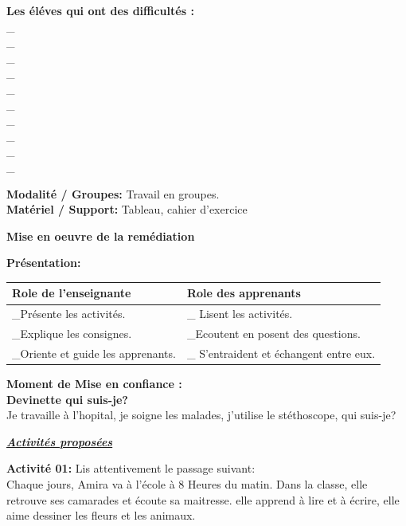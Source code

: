 \documentclass[a4paper,11pt]{article}
\begin{document}
\vspace{3pt}
\noindent\textbf{Les éléves qui ont des difficultés :}\\
\_{}\\[-3pt]
\_{}\\[-3pt]
\_{}\\[-3pt]
\_{}\\[-3pt]
\_{}\\[-3pt]
\_{}\\[-3pt]
\_{}\\[-3pt]
\_{}\\[-3pt]
\_{}\\[-3pt]
\_{}

\vspace{3pt}
\noindent\textbf{Modalité / Groupes:} Travail en groupes.\\
\textbf{Matériel / Support:} Tableau, cahier d'exercice

\vspace{4pt}
\begin{tcolorbox}[colback=white,colframe=black,arc=0mm,boxrule=0.8pt,halign=center,top=3pt,bottom=3pt]
\textbf{Mise en oeuvre de la remédiation}
\end{tcolorbox}

\vspace{-2pt}
\noindent\textbf{Présentation:}

\vspace{2pt}
\noindent
\begin{tabularx}{\textwidth}{|X|X|}
\hline
\textbf{Role de l'enseignante} & \textbf{Role des apprenants} \\
\hline
\_Présente les activités. & \_ Lisent les activités. \\
\_Explique les consignes. & \_Ecoutent en posent des questions. \\
\_Oriente et guide les apprenants. & \_ S'entraident et échangent entre eux. \\
\hline
\end{tabularx}

\vspace{4pt}
\noindent\textbf{Moment de Mise en confiance :}\\
\textbf{Devinette qui suis-je?}\\
Je travaille à l'hopital, je soigne les malades, j'utilise le stéthoscope, qui suis-je?

\vspace{4pt}
\noindent\textbf{\textit{\underline{Activités proposées}}}

\vspace{2pt}
\noindent\textbf{Activité 01:} Lis attentivement le passage suivant:\\
Chaque jours, Amira va à l'école à 8 Heures du matin. Dans la classe, elle retrouve ses camarades et écoute sa maitresse. elle apprend à lire et à écrire, elle aime dessiner les fleurs et les animaux.
\end{document}
